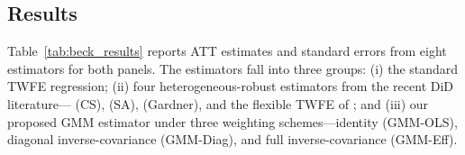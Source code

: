 \subsection{Results}

Table~\ref{tab:beck_results} reports ATT estimates and standard errors
from eight estimators for both panels. The estimators fall into three
groups: (i) the standard TWFE regression; (ii) four heterogeneous-robust
estimators from the recent DiD literature---\citet{callaway2021} (CS),
\citet{sun2021} (SA), \citet{gardner2024} (Gardner), and the flexible TWFE
of \citet{wooldridge2025}; and (iii) our proposed GMM estimator under three
weighting schemes---identity (GMM-OLS), diagonal inverse-covariance
(GMM-Diag), and full inverse-covariance (GMM-Eff).

